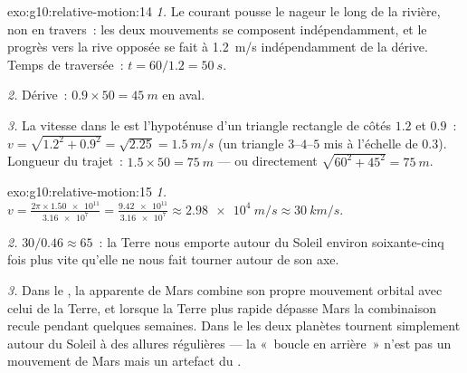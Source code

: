 \begin{solution}{exo:g10:relative-motion:14}
\emph{1.} Le courant pousse le nageur le long de la rivière, non en
travers~: les deux mouvements se composent indépendamment, et le
progrès vers la rive opposée se fait à \qty{1.2}{m/s} indépendamment
de la dérive. Temps de traversée~: $t = 60/1.2 = \qty{50}{s}$.

\emph{2.} Dérive~: $0.9 \times 50 = \qty{45}{m}$ en aval.

\emph{3.} La vitesse dans le  est l'hypoténuse d'un
triangle rectangle de côtés $1.2$ et $0.9$~:
$v = \sqrt{1.2^2 + 0.9^2} = \sqrt{2.25} = \qty{1.5}{m/s}$ (un triangle
$3$--$4$--$5$ mis à l'échelle de $0.3$). Longueur du trajet~:
$1.5 \times 50 = \qty{75}{m}$ --- ou directement
$\sqrt{60^2 + 45^2} = \qty{75}{m}$.
\end{solution}

\begin{solution}{exo:g10:relative-motion:15}
\emph{1.} $v = \frac{2\pi \times \num{1.50e11}}{\num{3.16e7}}
= \frac{\num{9.42e11}}{\num{3.16e7}} \approx \qty{2.98e4}{m/s}
\approx \qty{30}{km/s}$.

\emph{2.} $30 / 0.46 \approx 65$~: la Terre nous emporte autour du
Soleil environ soixante-cinq fois plus vite qu'elle ne nous fait
tourner autour de son axe.

\emph{3.} Dans le , la 
apparente de Mars combine son propre mouvement orbital avec celui de
la Terre, et lorsque la Terre plus rapide dépasse Mars la combinaison
recule pendant quelques semaines. Dans le
 les deux planètes tournent
simplement autour du Soleil à des allures régulières --- la «~boucle
en arrière~» n'est pas un mouvement de Mars mais un artefact du
.
\end{solution}

